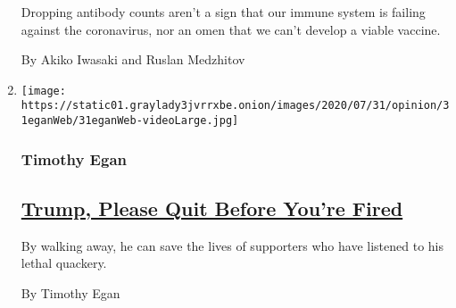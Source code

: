 \begin{enumerate}
  Dropping antibody counts aren't a sign that our immune system is
  failing against the coronavirus, nor an omen that we can't develop a
  viable vaccine.

  By Akiko Iwasaki and Ruslan Medzhitov
\item
  \texttt{[image: https://static01.graylady3jvrrxbe.onion/images/2020/07/31/opinion/31eganWeb/31eganWeb-videoLarge.jpg]}

  \hypertarget{timothy-egan}{%
  \subsubsection{Timothy Egan}\label{timothy-egan}}

  \hypertarget{trump-please-quit-before-youre-fired}{%
  \subsection{\texorpdfstring{\href{/2020/07/31/opinion/trump-resign.html}{Trump,
  Please Quit Before You're
  Fired}}{Trump, Please Quit Before You're Fired}}\label{trump-please-quit-before-youre-fired}}

  By walking away, he can save the lives of supporters who have listened
  to his lethal quackery.

  By Timothy Egan
\end{enumerate}

